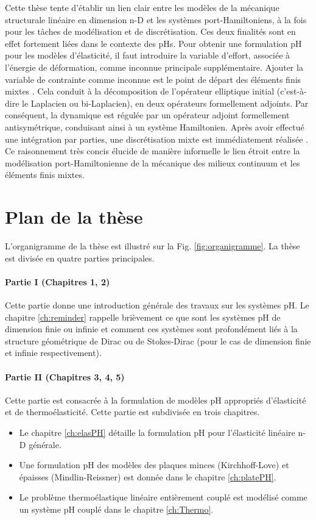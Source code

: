 Cette thèse tente d'établir un lien clair entre les modèles de la mécanique structurale linéaire en dimension n-D et les systèmes port-Hamiltoniens, à la fois pour les tâches de modélisation et de discrétisation. Ces deux finalités sont en effet fortement liées dans le contexte des pHs. Pour obtenir une formulation pH pour les modèles d'élasticité, il faut introduire la variable d'effort, associée à l'énergie de déformation, comme inconnue principale supplémentaire. Ajouter la variable de contrainte comme inconnue est le point de départ des éléments finis mixtes \cite{arnold1990intro}. Cela conduit à la décomposition de l'opérateur elliptique initial (c'est-à-dire le Laplacien ou bi-Laplacien), en deux opérateurs formellement adjoints. Par conséquent, la dynamique est régulée par un opérateur adjoint formellement antisymétrique, conduisant ainsi à un système Hamiltonien. Après avoir effectué une intégration par parties, une discrétisation mixte est immédiatement réalisée \cite{joly2003variational}. Ce raisonnement très concis élucide de manière informelle le lien étroit entre la modélisation port-Hamiltonienne de la mécanique des milieux continuum et les éléments finis mixtes.

\section{Plan de la thèse}


L'organigramme de la thèse est illustré sur la Fig. \ref{fig:organigramme}. La thèse est divisée en quatre parties principales.

\paragraph{Partie I (Chapitres 1, 2)}
Cette partie donne une introduction générale des travaux sur les systèmes pH. Le chapitre \ref{ch:reminder} rappelle brièvement ce que sont les systèmes pH de dimension finie ou infinie et comment ces systèmes sont profondément liés à la structure géométrique de Dirac ou de Stokes-Dirac (pour le cas de dimension finie et infinie respectivement).

\paragraph{Partie II (Chapitres 3, 4, 5)}
Cette partie est consacrée à la formulation de modèles pH appropriés d'élasticité et de thermoélasticité. Cette partie est subdivisée en trois chapitres.
\begin{itemize}
\item Le chapitre \ref{ch:elasPH} détaille la formulation pH pour l'élasticité linéaire n-D générale.
\item Une formulation pH des modèles des plaques minces (Kirchhoff-Love) et épaisses (Mindlin-Reissner) est donnée dans le chapitre \ref{ch:platePH}.
\item Le problème thermoélastique linéaire entièrement couplé est modélisé comme un système pH couplé dans le chapitre \ref{ch:Thermo}.
\end{itemize}


